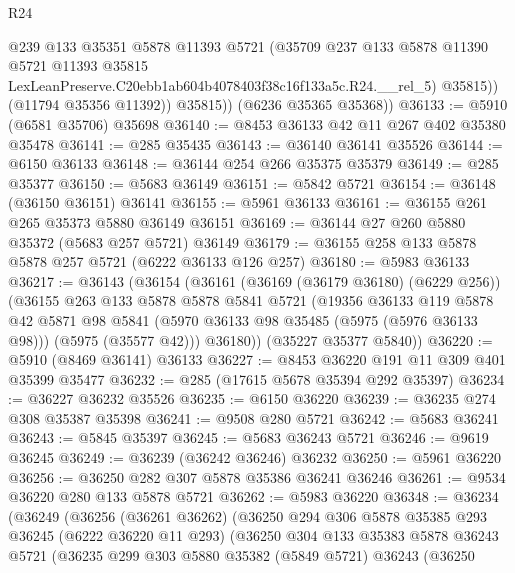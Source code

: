 \begin{lexlean}{R24}
\begin{coremodule}
                @239
                @133
                @35351
                @5878
                @11393
                @5721
                (@35709
                  @237
                  @133
                  @5878
                  @11390
                  @5721
                  @11393
                  @35815
                  LexLeanPreserve.C20ebb1ab604b4078403f38c16f133a5c.R24.__rel_5)
                @35815))
            (@11794 @35356 @11392))
          @35815))
      (@6236 @35365 @35368))
@36133 := @5910 (@6581 @35706) @35698
@36140 := @8453 @36133 @42 @11 @267 @402 @35380 @35478
@36141 := @285 @35435
@36143 := @36140 @36141 @35526
@36144 := @6150 @36133
@36148 := @36144 @254 @266 @35375 @35379
@36149 := @285 @35377
@36150 := @5683 @36149
@36151 := @5842 @5721
@36154 := @36148 (@36150 @36151) @36141
@36155 := @5961 @36133
@36161 := @36155 @261 @265 @35373 @5880 @36149 @36151
@36169 := @36144 @27 @260 @5880 @35372 (@5683 @257 @5721) @36149
@36179 := @36155 @258 @133 @5878 @5878 @257 @5721 (@6222 @36133 @126 @257)
@36180 := @5983 @36133
@36217 := @36143
    (@36154
      (@36161
        (@36169 (@36179 @36180) (@6229 @256))
        (@36155
          @263
          @133
          @5878
          @5878
          @5841
          @5721
          (@19356
            @36133
            @119
            @5878
            @42
            @5871
            @98
            @5841
            (@5970 @36133 @98 @35485 (@5975 (@5976 @36133 @98)))
            (@5975 (@35577 @42)))
          @36180))
      (@35227 @35377 @5840))
@36220 := @5910 (@8469 @36141) @36133
@36227 := @8453 @36220 @191 @11 @309 @401 @35399 @35477
@36232 := @285 (@17615 @5678 @35394 @292 @35397)
@36234 := @36227 @36232 @35526
@36235 := @6150 @36220
@36239 := @36235 @274 @308 @35387 @35398
@36241 := @9508 @280 @5721
@36242 := @5683 @36241
@36243 := @5845 @35397
@36245 := @5683 @36243 @5721
@36246 := @9619 @36245
@36249 := @36239 (@36242 @36246) @36232
@36250 := @5961 @36220
@36256 := @36250 @282 @307 @5878 @35386 @36241 @36246
@36261 := @9534 @36220 @280 @133 @5878 @5721
@36262 := @5983 @36220
@36348 := @36234
    (@36249
      (@36256
        (@36261 @36262)
        (@36250
          @294
          @306
          @5878
          @35385
          @293
          @36245
          (@6222 @36220 @11 @293)
          (@36250
            @304
            @133
            @35383
            @5878
            @36243
            @5721
            (@36235
              @299
              @303
              @5880
              @35382
              (@5849 @5721)
              @36243
              (@36250

\end{coremodule}
\end{lexlean}
